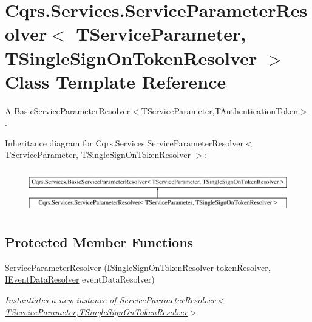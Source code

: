 \hypertarget{classCqrs_1_1Services_1_1ServiceParameterResolver}{}\section{Cqrs.\+Services.\+Service\+Parameter\+Resolver$<$ T\+Service\+Parameter, T\+Single\+Sign\+On\+Token\+Resolver $>$ Class Template Reference}
\label{classCqrs_1_1Services_1_1ServiceParameterResolver}


A \hyperlink{classCqrs_1_1Services_1_1BasicServiceParameterResolver_af82f43a2f64aa5c33a3692a2a689367b_af82f43a2f64aa5c33a3692a2a689367b}{Basic\+Service\+Parameter\+Resolver$<$\+T\+Service\+Parameter,\+T\+Authentication\+Token$>$}.  


Inheritance diagram for Cqrs.\+Services.\+Service\+Parameter\+Resolver$<$ T\+Service\+Parameter, T\+Single\+Sign\+On\+Token\+Resolver $>$\+:\begin{figure}[H]
\begin{center}
\leavevmode
\includegraphics[height=1.876047cm]{classCqrs_1_1Services_1_1ServiceParameterResolver}
\end{center}
\end{figure}
\subsection*{Protected Member Functions}
\begin{DoxyCompactItemize}
\item 
\hyperlink{classCqrs_1_1Services_1_1ServiceParameterResolver_ad7afabf942df245316a2b27d31ee30bd_ad7afabf942df245316a2b27d31ee30bd}{Service\+Parameter\+Resolver} (\hyperlink{interfaceCqrs_1_1Services_1_1ISingleSignOnTokenResolver}{I\+Single\+Sign\+On\+Token\+Resolver} token\+Resolver, \hyperlink{interfaceCqrs_1_1Services_1_1IEventDataResolver}{I\+Event\+Data\+Resolver} event\+Data\+Resolver)
\begin{DoxyCompactList}\small\item\em Instantiates a new instance of \hyperlink{classCqrs_1_1Services_1_1ServiceParameterResolver_ad7afabf942df245316a2b27d31ee30bd_ad7afabf942df245316a2b27d31ee30bd}{Service\+Parameter\+Resolver$<$\+T\+Service\+Parameter,\+T\+Single\+Sign\+On\+Token\+Resolver$>$} \end{DoxyCompactList}\end{DoxyCompactItemize}

